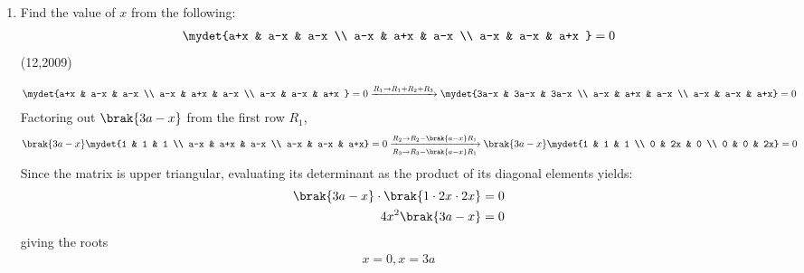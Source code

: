 \begin{enumerate}[label=\thesubsection.\arabic*, ref=\thesubsection.\theenumi]
    
    \item Find the value of $x$ from the following:
     \begin{align*}
     \mydet{a+x & a-x & a-x \\
       a-x & a+x & a-x \\
        a-x & a-x & a+x }  = 0
     \end{align*} \hfill{(12,2009)} \\
     \solution
          
    \begin{align}
    	\mydet{a+x & a-x & a-x \\
    		a-x & a+x & a-x \\
    		a-x & a-x & a+x }  = 0  \xrightarrow{R_1 \to R_1+R_2+R_3}
    	\mydet{3a-x & 3a-x & 3a-x \\
    		a-x & a+x & a-x \\
    		a-x & a-x & a+x} = 0
    \end{align}
    Factoring out $\brak{3a-x}$ from the first row $R_1$,
    \begin{align}
    	\brak{3a-x} \mydet{1 & 1 & 1 \\
    		a-x & a+x & a-x \\
    		a-x & a-x & a+x} = 0  \xrightarrow[R_3 \to R_3 - \brak{a-x}R_1] {R_2 \to R_2 - \brak{a-x}R_1 } 
    	\brak{3a-x} \mydet{1 & 1 & 1 \\
    		0 & 2x & 0 \\
    		0 & 0 & 2x} = 0
    \end{align}
    Since the matrix is upper triangular, evaluating its determinant as the product of its diagonal elements yields:
    \begin{align}
    	\brak{3a-x} \cdot \brak{1 \cdot 2x \cdot 2x} &= 0
    	\\
    	4x^2 \brak{3a-x} &= 0
    \end{align}
    giving the roots
    \begin{align}
    	x = 0 , x = 3a
    \end{align}
                    

\end{enumerate}
